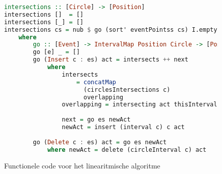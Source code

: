 \begin{figure}[H]
\begin{lstlisting}[language=Haskell]
intersections :: [Circle] -> [Position]
intersections []  = []
intersections [_] = []
intersections cs = nub $ go (sort' eventPointss cs) I.empty
    where
        go :: [Event] -> IntervalMap Position Circle -> [Position]
        go [e] _ = []
        go (Insert c : es) act = intersects ++ next
            where
                intersects 
                	= concatMap 
                	  (circlesIntersections c) 
                	  overlapping
                overlapping = intersecting act thisInterval
                
                next = go es newAct
                newAct = insert (interval c) c act
              
        go (Delete c : es) act = go es newAct
            where newAct = delete (circleInterval c) act
\end{lstlisting}
\label{imp:linearithmic}
\caption{Functionele code voor het linearitmische algoritme}
\end{figure}